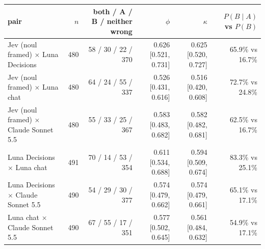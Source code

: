 \begin{tabular}{lrrrrr}
\toprule
pair & $n$ & both / A / B / neither wrong & $\phi$ & $\kappa$ & $P(B \mid A)$ vs $P(B)$ \\
\midrule
Jev (noul framed) $\times$ Luna Decisions & 480 & 58 / 30 / 22 / 370 & 0.626 [0.521, 0.731] & 0.625 [0.520, 0.727] & 65.9\% vs 16.7\% \\
Jev (noul framed) $\times$ Luna chat & 480 & 64 / 24 / 55 / 337 & 0.526 [0.431, 0.616] & 0.516 [0.420, 0.608] & 72.7\% vs 24.8\% \\
Jev (noul framed) $\times$ Claude Sonnet 5.5 & 480 & 55 / 33 / 25 / 367 & 0.583 [0.483, 0.682] & 0.582 [0.482, 0.681] & 62.5\% vs 16.7\% \\
Luna Decisions $\times$ Luna chat & 491 & 70 / 14 / 53 / 354 & 0.611 [0.534, 0.688] & 0.594 [0.509, 0.674] & 83.3\% vs 25.1\% \\
Luna Decisions $\times$ Claude Sonnet 5.5 & 490 & 54 / 29 / 30 / 377 & 0.574 [0.479, 0.662] & 0.574 [0.479, 0.661] & 65.1\% vs 17.1\% \\
Luna chat $\times$ Claude Sonnet 5.5 & 490 & 67 / 55 / 17 / 351 & 0.577 [0.502, 0.645] & 0.561 [0.484, 0.632] & 54.9\% vs 17.1\% \\
\bottomrule
\end{tabular}
